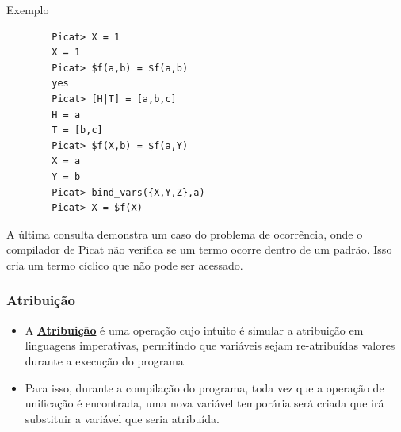 \begin{frame}[fragile]
	
	\begin{exampleblock}{Exemplo}
		
		\begin{verbatim}
		Picat> X = 1
		X = 1
		Picat> $f(a,b) = $f(a,b)
		yes
		Picat> [H|T] = [a,b,c]
		H = a
		T = [b,c]
		Picat> $f(X,b) = $f(a,Y)
		X = a
		Y = b
		Picat> bind_vars({X,Y,Z},a)
		Picat> X = $f(X)
		\end{verbatim}
		
		A última consulta demonstra um caso do problema de ocorrência, onde o compilador de Picat não
		verifica se um termo ocorre dentro de um padrão. Isso cria um termo cíclico que não pode ser
		acessado. %
		
	\end{exampleblock}
	
\end{frame}

\begin{frame}[fragile]
	\frametitle{Atribuição}
	
	\begin{itemize}
		
		\item A \textbf{\underline{Atribuição}} é uma operação cujo intuito é simular a atribuição em
		linguagens imperativas, permitindo que variáveis sejam re-atribuídas valores durante a execução
		do programa
		
		\item Para isso, durante a compilação do programa, toda vez que a operação de unificação é 	
		encontrada, uma nova variável temporária será criada que irá substituir a variável que seria
		atribuída.
		
	\end{itemize}
	
\end{frame}


